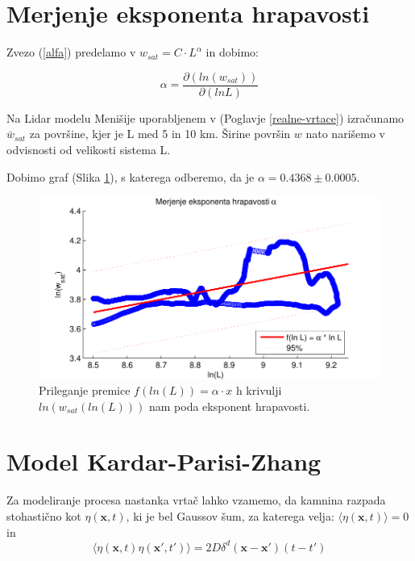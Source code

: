 \documentclass[a4paper, twoside, 12pt]{book}
\begin{document}
    \section{Merjenje eksponenta hrapavosti}
    \label{hrapavost}

    Zvezo (\ref{alfa}) predelamo  v $ w_{sat}=C \cdot L^\alpha $ in dobimo:

    \begin{equation}
      \alpha = \frac{\partial ( ln (w_{sat}) ) }{\partial ( ln L )}
      \label{alpha-numeric}
    \end{equation}

    Na Lidar modelu Menišije uporabljenem v (Poglavje \ref{realne-vrtace}) izračunamo $\bar{w}_{sat}$ za površine, kjer je L med 5 in 10 km. Širine površin $w$ nato narišemo v odvisnosti od velikosti sistema L.

    Dobimo graf (Slika \ref{fig:menisija-alfa}), s katerega odberemo, da je $\alpha =  0.4368 \pm 0.0005$.

    \begin{figure}[h]
      \begin{center}
        \includegraphics{slike/menisija-alfa.pdf}
      \end{center}
      \caption{Prileganje premice $f(ln(L)) = \alpha \cdot x$ h krivulji $ln(w_{sat}(ln(L)))$ nam poda eksponent hrapavosti.}
      \label{fig:menisija-alfa}
    \end{figure}


    \section{Model Kardar-Parisi-Zhang}

    Za modeliranje procesa nastanka vrtač lahko vzamemo, da kamnina razpada stohastično kot $\eta(\mathbf{x},t)$, ki je bel Gaussov šum, za katerega velja: $ \langle \eta(\mathbf{x},t) \rangle=0 $ in
    \begin{equation}
      \langle \eta(\mathbf{x},t) \eta(\mathbf{x'},t')\rangle = 2 D \delta^d(\mathbf{x}-\mathbf{x'})(t-t')
    \end{equation}
\end{document}
